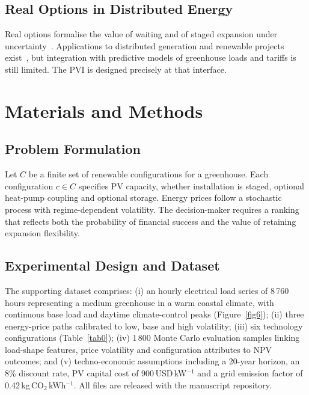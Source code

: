\documentclass[agriengineering,article,submit,pdftex,moreauthors]{Definitions/mdpi}
\begin{document}
\subsection{Real Options in Distributed Energy}

Real options formalise the value of waiting and of staged expansion under uncertainty~\cite{ref-dixit,ref-trigeorgis,ref-amram,ref-mcdonald,ref-fernandez}. Applications to distributed generation and renewable projects exist~\cite{ref-fernandez,ref-boomsma}, but integration with predictive models of greenhouse loads and tariffs is still limited. The PVI is designed precisely at that interface.

\section{Materials and Methods}

\subsection{Problem Formulation}

Let $C$ be a finite set of renewable configurations for a greenhouse. Each configuration $c \in C$ specifies PV capacity, whether installation is staged, optional heat-pump coupling and optional storage. Energy prices follow a stochastic process with regime-dependent volatility. The decision-maker requires a ranking that reflects both the probability of financial success and the value of retaining expansion flexibility.

\subsection{Experimental Design and Dataset}

The supporting dataset comprises: (i) an hourly electrical load series of 8\,760 hours representing a medium greenhouse in a warm coastal climate, with continuous base load and daytime climate-control peaks (Figure~\ref{fig6}); (ii) three energy-price paths calibrated to low, base and high volatility; (iii) six technology configurations (Table~\ref{tab0}); (iv) 1\,800 Monte Carlo evaluation samples linking load-shape features, price volatility and configuration attributes to NPV outcomes; and (v) techno-economic assumptions including a 20-year horizon, an 8\% discount rate, PV capital cost of 900\,USD\,kW$^{-1}$ and a grid emission factor of 0.42\,kg\,CO$_2$\,kWh$^{-1}$. All files are released with the manuscript repository.
\end{document}
